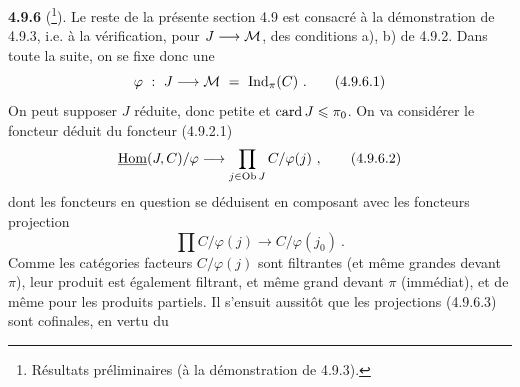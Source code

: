 
\textbf{4.9.6} (\footnote[96]{Résultats préliminaires (à la démonstration de 4.9.3).}). Le reste de la présente section 4.9 est consacré à la démonstration de 4.9.3, i.e. à la vérification, pour $J \longrightarrow \mathcal{M}$, des conditions a), b) de 4.9.2. Dans toute la suite, on se fixe donc une
\[
\varphi \ : \ J \longrightarrow \mathcal{M} \ = \ \operatorname{Ind}_\pi(C) \ . \tag*{(4.9.6.1)}
\]
On peut supposer $J$ réduite, donc petite et $\operatorname{card} J \leqslant \pi_0$. On va considérer le foncteur déduit du foncteur (4.9.2.1)
\[
\underline{\operatorname{Hom}}(J,C)/\varphi \longrightarrow \prod_{j \in \operatorname{Ob} J} C/\varphi(j) \ , \tag*{(4.9.6.2)}
\]
dont les foncteurs en question se déduisent en composant avec les foncteurs projection
\[
\prod C/\varphi(j) \longrightarrow C/\varphi(j_0) \ . \tag*{(4.9.6.3)}
\]
Comme les catégories facteurs $C/\varphi(j)$ sont filtrantes (et même grandes devant $\pi$), leur produit est également filtrant, et même grand devant $\pi$ (immédiat), et de même
pour les produits partiels. Il s'ensuit aussitôt que les projections (4.9.6.3) sont cofinales, en vertu du

